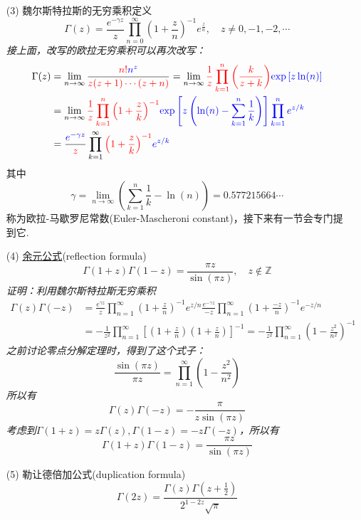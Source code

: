 \documentclass[UTF8]{ctexart}
\begin{document}
\begin{itemize}
    \item[(3)] 魏尔斯特拉斯的无穷乘积定义
    \[\Gamma(z) = \frac{e^{-\gamma z}}{z}\prod_{n=0}^{\infty}\left( 1+\frac{z}{n} \right)^{-1} e^{\frac{z}{n}}, \quad z \neq 0, -1, -2, \cdots\]
    \textit{接上面，改写的欧拉无穷乘积可以再次改写：}
    \begin{align*}
        \Gamma(z) &= \lim_{n \to \infty} \frac{{\color{red}n!}{\color{blue}n^z}}{{\color{red}z(z+1)\cdots(z+n)}} = \lim_{n \to \infty} {\color{red}\frac{1}{z}\prod_{k=1}^{n}\left(\frac{k}{z+k}\right)}{\color{blue}\exp\left[z\ln(n)\right]} \\
        &= \lim_{n \to \infty} {\color{red}\frac{1}{z}\prod_{k=1}^{n}\left(1+\frac{z}{k}\right)^{-1}}{\color{blue}\exp\left[z\left(\ln(n) - \sum_{k=1}^{n}\frac{1}{k}\right)\right]\prod_{k=1}^{n}e^{z/k}} \\
        &= \frac{{\color{blue}e^{-\gamma z}}}{{\color{red}z}}\prod_{k=1}^{\infty}{\color{red}\left(1+\frac{z}{k}\right)^{-1}}{\color{blue}e^{z/k}}
    \end{align*}
    其中
    \[\gamma = \lim_{n \to \infty} \left(\sum_{k=1}^{n}\frac{1}{k} - \ln(n)\right) = 0.577215664\cdots \]
    称为欧拉-马歇罗尼常数(Euler-Mascheroni constant)，接下来有一节会专门提到它.
    \item[(4)] \uline{余元公式}(reflection formula) 
    \[\Gamma(1+z)\Gamma(1-z) = \frac{\pi z}{\sin(\pi z)}, \quad z \not\in \mathbb{Z}\]
    \textit{
        证明：利用魏尔斯特拉斯无穷乘积
        \begin{align*}
            \Gamma(z)\Gamma(-z) &= \frac{e^{\gamma z}}{z}\prod_{n=1}^{\infty}\left(1+\frac{z}{n}\right)^{-1}e^{z/n}\frac{e^{-\gamma z}}{-z}\prod_{n=1}^{\infty}\left(1+\frac{-z}{n}\right)^{-1}e^{-z/n} \\
            &= -\frac{1}{z^2}\prod_{n=1}^{\infty}\left[\left(1+\frac{z}{n}\right)\left(1+\frac{z}{n}\right)\right]^{-1} = -\frac{1}{z^2}\prod_{n=1}^{\infty}\left(1-\frac{z^2}{n^2}\right)^{-1}
        \end{align*}
        之前讨论零点分解定理时，得到了这个式子：
        \[\frac{\sin(\pi z)}{\pi z} = \prod_{n=1}^{\infty}\left(1-\frac{z^2}{n^2}\right)\]
        所以有
        \[\Gamma(z)\Gamma(-z) = -\frac{\pi}{z\sin(\pi z)}\]
        考虑到\(\Gamma(1+z)=z\Gamma(z), \Gamma(1-z) = -z\Gamma(-z)\)，所以有
        \[\Gamma(1+z)\Gamma(1-z) = \frac{\pi z}{\sin(\pi z)}\]
    }
    \item[(5)] 勒让德倍加公式(duplication formula)
    \[ \Gamma(2z) = \frac{\Gamma(z)\Gamma(z+\frac{1}{2})}{2^{1-2z}\sqrt{\pi}} \]
    \textit{
}
\end{itemize}
\end{document}
